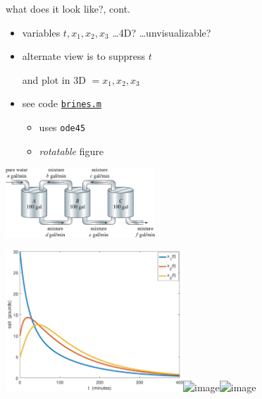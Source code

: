 \documentclass[urlcolor=blue,dvipsnames]{beamer}
\begin{document}
\begin{frame}{what does it look like?, cont.}

\begin{itemize}
\item variables $t,x_1,x_2,x_3$ \dots 4D? \dots unvisualizable?
\item alternate view is to suppress $t$

and plot in 3D $=x_1,x_2,x_3$
\item see code \href{https://bueler.github.io/math302/assets/codes/brines.m}{\texttt{brines.m}}
    \begin{itemize}
    \item<2> uses \texttt{ode45}
    \item<2> \emph{rotatable} figure
    \end{itemize}
\end{itemize}

\vspace{-21mm}
\hfill \includegraphics[width=0.42\textwidth]{figs/three-tanks}

\mbox{\includegraphics[width=0.5\textwidth]{figs/brines-xvt}\quad \includegraphics<1>[width=0.5\textwidth]{figs/brines-3d}\includegraphics<2>[width=0.5\textwidth]{figs/brines-3d-again}}
\end{frame}
\end{document}
